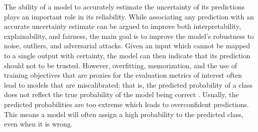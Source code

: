 The ability of a model to accurately estimate the uncertainty of its predictions plays an important role in its reliability. While associating any prediction with an accurate uncertainty estimate can be argued to improve both interpretability, explainability, and fairness, the main goal is to improve the model's robustness to noise, outliers, and adversarial attacks. 
Given an input which cannot be mapped to a single output with certainty, the model can then indicate that its prediction should not to be trusted. 
However, overfitting, memorization, and the use of training objectives that are proxies for the evaluation metrics of interest often lead to models that are miscalibrated; that is, the predicted probability of a class does not reflect the true probability of the model being correct \parencite{guo_calibration_2017, kull_temperature_2019}. 
Usually, the predicted probabilities are too extreme which leads to overconfident predictions. This means a model will often assign a high probability to the predicted class, even when it is wrong. 



